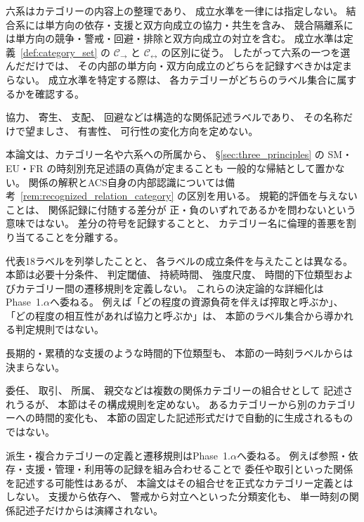 \begin{remark}[六系分類と成立水準の独立性]
\label{rem:six_system_directionality}
六系はカテゴリーの内容上の整理であり、
成立水準を一律には指定しない。
結合系には単方向の依存・支援と双方向成立の協力・共生を含み、
競合隔離系には単方向の競争・警戒・回避・排除と双方向成立の対立を含む。
成立水準は定義~\ref{def:category_set} の
$\mathcal C_{\rightarrow}$ と $\mathcal C_{\leftrightarrow}$ の区別に従う。
したがって六系の一つを選んだだけでは、
その内部の単方向・双方向成立のどちらを記録すべきかは定まらない。
成立水準を特定する際は、
各カテゴリーがどちらのラベル集合に属するかを確認する。
\end{remark}

\begin{remark}[カテゴリーと規範評価の分離]
\label{rem:category_neutral}
協力、
寄生、
支配、
回避などは構造的な関係記述ラベルであり、
その名称だけで望ましさ、
有害性、
可行性の変化方向を定めない。

本論文は、カテゴリー名や六系への所属から、
\S\ref{sec:three_principles} の SM・EU・FR の時刻別充足述語の真偽が定まることも
一般的な帰結として置かない。
関係の解釈とACS自身の内部認識については備考~\ref{rem:recognized_relation_category} の区別を用いる。
規範的評価を与えないことは、
関係記録に付随する差分が
正・負のいずれであるかを問わないという意味ではない。
差分の符号を記録することと、
カテゴリー名に倫理的善悪を割り当てることを分離する。
\end{remark}

\begin{remark}[カテゴリー成立条件の未定義性]
\label{rem:category_phase1a}
代表18ラベルを列挙したことと、
各ラベルの成立条件を与えたことは異なる。
本節は必要十分条件、
判定閾値、
持続時間、
強度尺度、
時間的下位類型およびカテゴリー間の遷移規則を定義しない。
これらの決定論的な詳細化はPhase~1.$\alpha$へ委ねる。
例えば「どの程度の資源負荷を伴えば搾取と呼ぶか」、
「どの程度の相互性があれば協力と呼ぶか」は、
本節のラベル集合から導かれる判定規則ではない。

長期的・累積的な支援のような時間的下位類型も、
本節の一時刻ラベルからは決まらない。
\end{remark}

\begin{remark}[派生カテゴリーと複合カテゴリー]
\label{rem:derived_composite_categories}
委任、
取引、
所属、
親交などは複数の関係カテゴリーの組合せとして
記述されうるが、
本節はその構成規則を定めない。
あるカテゴリーから別のカテゴリーへの時間的変化も、
本節の固定した記述形式だけで自動的に生成されるものではない。

派生・複合カテゴリーの定義と遷移規則はPhase~1.$\alpha$へ委ねる。
例えば参照・依存・支援・管理・利用等の記録を組み合わせることで
委任や取引といった関係を記述する可能性はあるが、
本論文はその組合せを正式なカテゴリー定義とはしない。
支援から依存へ、
警戒から対立へといった分類変化も、
単一時刻の関係記述子だけからは演繹されない。
\end{remark}

